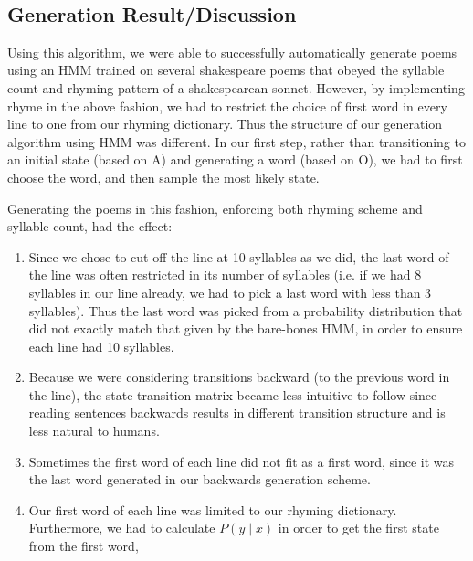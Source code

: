 ~

\subsection*{Generation Result/Discussion}

Using this algorithm, we were able to successfully automatically generate poems using an HMM trained on several shakespeare poems that obeyed the syllable count and rhyming pattern of a shakespearean sonnet. However, by implementing rhyme in the above fashion, we had to restrict the choice of first word in every line to one from our rhyming dictionary. Thus the structure of our generation algorithm using HMM was different. In our first step, rather than transitioning to an initial state (based on A) and generating a word (based on O), we had to first choose the word, and then sample the most likely state.

Generating the poems in this fashion, enforcing both rhyming scheme and syllable count, had the effect:

\begin{enumerate}

\item Since we chose to cut off the line at 10 syllables as we did, the last word of the line was often restricted in its number of syllables (i.e. if we had 8 syllables in our line already, we had to pick a last word with less than 3 syllables). Thus the last word was picked from a probability distribution that did not exactly match that given by the bare-bones HMM, in order to ensure each line had 10 syllables.

\item Because we were considering transitions backward (to the previous word in the line), the state transition matrix became less intuitive to follow since reading sentences backwards results in different transition structure and is less natural to humans.

\item Sometimes the first word of each line did not fit as a first word, since it was the last word generated in our backwards generation scheme.

\item Our first word of each line was limited to our rhyming dictionary. Furthermore, we had to calculate $P(y \mid x)$ in order to get the first state from the first word, 

\end{enumerate}

